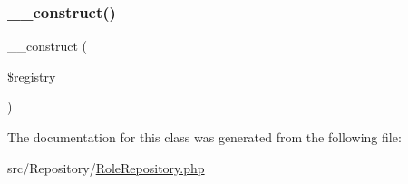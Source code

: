 \subsubsection{\texorpdfstring{\+\_\+\+\_\+construct()}{\_\_construct()}}
{\footnotesize\ttfamily \+\_\+\+\_\+construct (\begin{DoxyParamCaption}\item[{Manager\+Registry}]{\$registry }\end{DoxyParamCaption})}



The documentation for this class was generated from the following file\+:\begin{DoxyCompactItemize}
\item 
src/\+Repository/\mbox{\hyperlink{_role_repository_8php}{Role\+Repository.\+php}}\end{DoxyCompactItemize}
